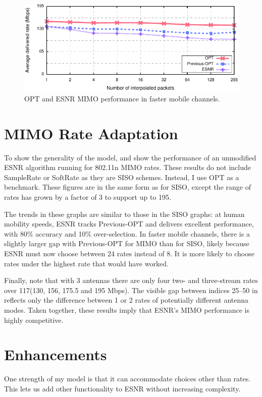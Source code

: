 \begin{figure}[ht]
      \centering
      \includegraphics[width=\textwidth]{figures/rate/mimo_rate_skip.pdf}
      \caption{\label{fig:mimo_eff_snr_speedup} OPT and ESNR MIMO performance in faster mobile channels.}
\end{figure}

\section{MIMO Rate Adaptation}
To show the generality of the model,  and  show the performance of an unmodified ESNR algorithm running for 802.11n MIMO rates. These results do not include SampleRate or SoftRate as they are SISO schemes. Instead, I use OPT as a benchmark.
These figures are in the same form as for SISO, except the range of rates has grown by a factor of 3 to support up to 195\Mbps. 

The trends in these graphs are similar to those in the SISO graphs: at human mobility speeds, ESNR tracks Previous-OPT and delivers excellent performance, with 80\% accuracy and 10\% over-selection. In faster mobile channels, there is a slightly larger gap with Previous-OPT for MIMO than for SISO, likely because ESNR must now choose between 24 rates instead of 8. It is more likely to choose rates under the highest rate that would have worked. 

Finally, note that with 3 antennas there are only four two- and three-stream rates over 117\Mbps (130, 156, 175.5 and 195 Mbps). The visible gap between indices 25--50 in  reflects only the difference between 1 or 2 rates of potentially different antenna modes. Taken together, these results imply that ESNR's MIMO performance is highly competitive.


\section{Enhancements}
One strength of my model is that it can accommodate choices other than rates. This lets us add other functionality to ESNR without increasing complexity.%

